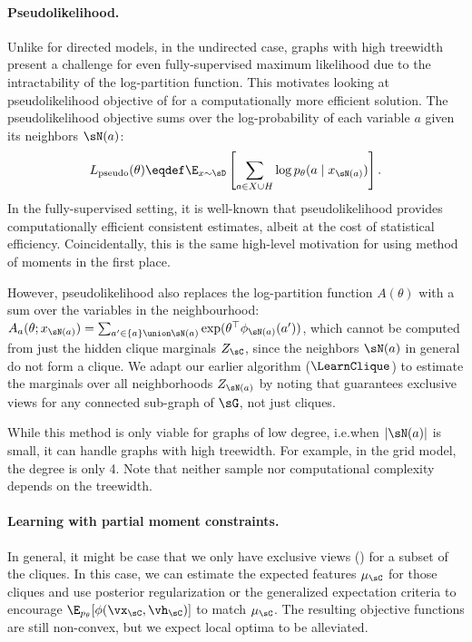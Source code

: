 \paragraph{Pseudolikelihood.}
Unlike for directed models, in the undirected case,
graphs with high treewidth present a challenge
for even fully-supervised maximum likelihood due to the intractability of the log-partition function.
This motivates looking at pseudolikelihood objective of \citep{besag75pseudo} for a computationally more
efficient solution.
The pseudolikelihood objective sums over the log-probability of each variable $a$ given its neighbors $\sN(a)$:
$$L_\text{pseudo}(\theta) \eqdef \E_{x \sim \sD}\left[\sum_{a \in X \cup H} \log p_\theta(a \mid x_{\sN(a)})\right].$$
In the fully-supervised setting, it is well-known that pseudolikelihood provides computationally efficient consistent estimates,
albeit at the cost of statistical efficiency.
Coincidentally, this is the same high-level motivation for using method of moments in the first place.

However, pseudolikelihood also replaces the log-partition function $A(\theta)$
with a sum over the variables in the neighbourhood: $A_a(\theta; x_{\sN(a)}) = \sum_{a' \in \{a\} \union \sN(a)} \exp(\theta^\top\phi_{\sN(a)}(a'))$,
which cannot be computed from just the hidden clique marginals $Z_\sC$,
since the neighbors $\sN(a)$ in general do not form a clique.
We adapt our earlier algorithm ($\LearnClique$) to estimate the
  marginals over all neighborhoods $Z_{\sN(a)}$ by noting that
   guarantees exclusive views for any connected
  sub-graph of $\sG$, not just cliques.

While this method is only viable for graphs of low degree, i.e.\@ when $|\sN(a)|$ is small,
it can handle graphs with high treewidth.
For example, in the grid model, the degree is only 4.
Note that neither sample nor computational complexity depends on the treewidth.

\paragraph{Learning with partial moment constraints.}

In general, it might be case that we only have exclusive views () for a subset of the cliques.
In this case, we can estimate the expected features $\mu_\sC$ for those cliques
  and use posterior regularization \citep{graca08em} or the generalized expectation criteria \citep{mann08ge}
  to encourage $\E_{p_\theta}[\phi(\vx_\sC,\vh_\sC)]$ to match $\mu_\sC$.
The resulting objective functions are still non-convex, but we expect
  local optima to be alleviated. 

